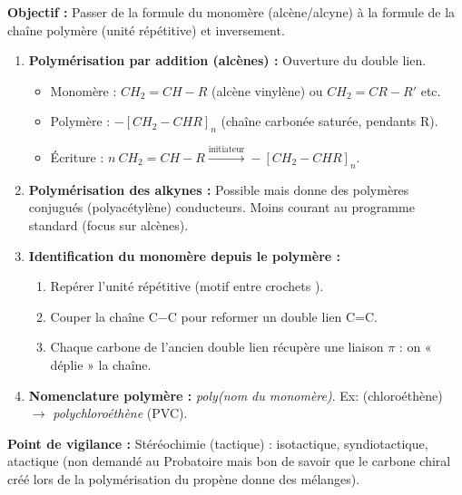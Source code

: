 \documentclass[11pt]{article}
\begin{document}
\begin{methode}
\textbf{Objectif :} Passer de la formule du monomère (alcène/alcyne) à la formule de la chaîne polymère (unité répétitive) et inversement.

\begin{enumerate}
    \item \textbf{Polymérisation par addition (alcènes) :} Ouverture du double lien. 
\begin{itemize}
            \item Monomère : $CH_2=CH-R$ (alcène vinylène) ou $CH_2=CR-R'$ etc.
            \item Polymère : $-[CH_2-CHR]_n$ (chaîne carbonée saturée, pendants R).
            \item Écriture : $n\ CH_2=CH-R \xrightarrow{\text{initiateur}} -[CH_2-CHR]_n$.
        \end{itemize}
    \item \textbf{Polymérisation des alkynes :} Possible mais donne des polymères conjugués (polyacétylène) conducteurs. Moins courant au programme standard (focus sur alcènes).
    \item \textbf{Identification du monomère depuis le polymère :}
        \begin{enumerate}
            \item Repérer l'unité répétitive (motif entre crochets ).
            \item Couper la chaîne C$-$C pour reformer un double lien C=C.
            \item Chaque carbone de l'ancien double lien récupère une liaison $\pi$ : on « déplie » la chaîne.
        \end{enumerate}
    \item \textbf{Nomenclature polymère :} \textit{poly(nom du monomère)}. Ex:  (chloroéthène) $\rightarrow$ \textit{polychloroéthène} (PVC).
\end{enumerate}
\textbf{Point de vigilance :} Stéréochimie (tactique) : isotactique, syndiotactique, atactique (non demandé au Probatoire mais bon de savoir que le carbone chiral créé lors de la polymérisation du propène donne des mélanges).
\end{methode}
\end{document}
